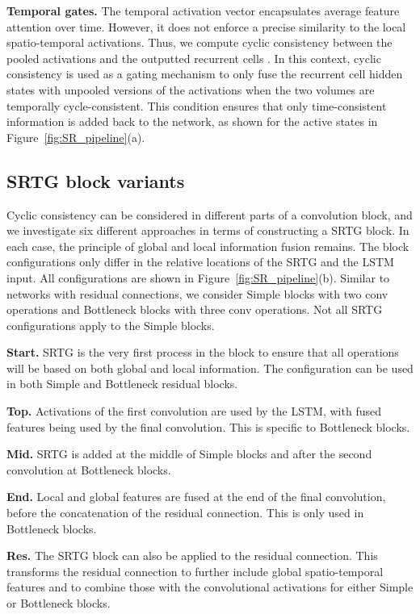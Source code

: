 \documentclass[final,5p,times,twocolumn]{elsarticle}
\begin{document}
\textbf{Temporal gates.} The temporal activation vector encapsulates average feature attention over time. However, it does not enforce a precise similarity to the local spatio-temporal activations. Thus, we compute cyclic consistency between the pooled activations  and the outputted recurrent cells . In this context, cyclic consistency is used as a gating mechanism to only fuse the recurrent cell hidden states with unpooled versions of the activations when the two volumes are temporally cycle-consistent. This condition ensures that only time-consistent information is added back to the network, as shown for the active states in Figure~\ref{fig:SR_pipeline}(a).


\subsection{SRTG block variants}
\label{sec:Variants}

Cyclic consistency can be considered in different parts of a convolution block, and we investigate six different approaches in terms of constructing a SRTG block. In each case, the principle of global and local information fusion remains. The block configurations only differ in the relative locations of the SRTG and the LSTM input. All configurations are shown in Figure~\ref{fig:SR_pipeline}(b). Similar to networks with residual connections, we consider Simple blocks with two conv operations and Bottleneck blocks with three conv operations. Not all SRTG configurations apply to the Simple blocks.

\textbf{Start.} SRTG is the very first process in the block to ensure that all operations will be based on both global and local information. The configuration can be used in both Simple and Bottleneck residual blocks.

\textbf{Top.} Activations of the first convolution are used by the LSTM, with fused features being used by the final convolution. This is specific to Bottleneck blocks.

\textbf{Mid.} SRTG is added at the middle of Simple blocks and after the second convolution at Bottleneck blocks.

\textbf{End.} Local and global features are fused at the end of the final convolution, before the concatenation of the residual connection. This is only used in Bottleneck blocks.

\textbf{Res.} The SRTG block can also be applied to the residual connection. This transforms the residual connection to further include global spatio-temporal features and to combine those with the convolutional activations for either Simple or Bottleneck blocks.
\end{document}
